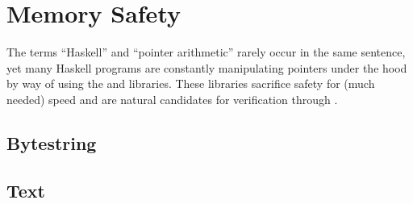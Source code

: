 \section{Memory Safety}\label{sec:memory-safety}

The terms ``Haskell'' and ``pointer arithmetic'' rarely occur in the same
sentence, yet many Haskell programs are constantly manipulating pointers under
the hood by way of using the \bytestring and \libtext libraries. These libraries
sacrifice safety for (much needed) speed and are natural candidates for
verification through \toolname.

\subsection{Bytestring}\label{sec:bytestring}


\subsection{Text}\label{sec:text}




